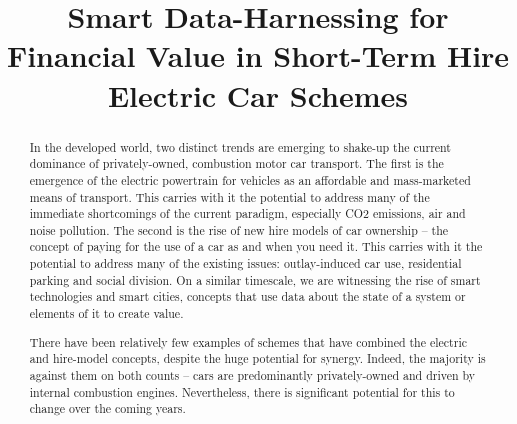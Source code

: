 \documentclass[conference]{IEEEtran}
\begin{document}
\title{Smart Data-Harnessing for Financial Value in Short-Term Hire Electric Car Schemes}


\author{
\and
{}
\and
{}
}



\maketitle


\begin{abstract}
In the developed world, two distinct trends are emerging to shake-up
the current dominance of privately-owned, combustion motor car
transport. The first is the emergence of the electric powertrain for
vehicles as an affordable and mass-marketed means of transport. This
carries with it the potential to address many of the immediate
shortcomings of the current paradigm, especially CO2 emissions, air
and noise pollution. The second is the rise of new hire models of car
ownership -- the concept of paying for the use of a car as and when
you need it. This carries with it the potential to address many of the
existing issues: outlay-induced car use, residential parking and
social division.  On a similar timescale, we are witnessing the rise
of smart technologies and smart cities, concepts that use data about
the state of a system or elements of it to create value.

There have been relatively few examples of schemes that have combined
the electric and hire-model concepts, despite the huge potential for
synergy. Indeed, the majority is against them on both counts -- cars
are predominantly privately-owned and driven by internal combustion
engines. Nevertheless, there is significant potential for this to
change over the coming years.
\end{abstract}
\end{document}
